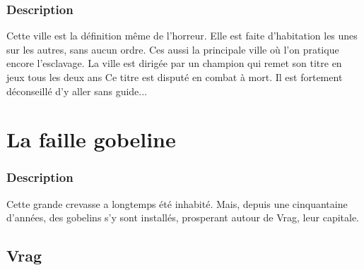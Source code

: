 \subsubsection{Description}
\hypertarget {mauhagr}{}Cette ville est la définition même de l'horreur.
Elle est faite d'habitation les unes sur les autres, sans aucun ordre. 
Ces aussi la principale ville où l'on pratique encore l'esclavage.
La ville est dirigée par un champion qui remet son titre en jeux tous les deux ans
Ce titre est disputé en combat à mort. 
Il est fortement déconseillé d'y aller sans guide...
\section{La faille gobeline}
\subsubsection{Description}
\hypertarget {lafaillegobeline}{}Cette grande crevasse a longtemps été inhabité.
Mais, depuis une cinquantaine d'années, des gobelins s'y sont installés, prosperant autour de Vrag, leur capitale.
\subsection{Vrag}
